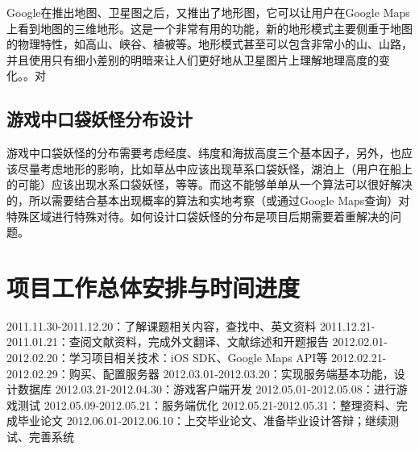 \documentclass{article}
\begin{document}
\begin{CJK}{UTF8}{gbsn}
  Google在推出地图、卫星图之后，又推出了地形图，它可以让用户在Google Maps上看到地图的三维地形。这是一个非常有用的功能，新的地形模式主要侧重于地图的物理特性，如高山、峡谷、植被等。地形模式甚至可以包含非常小的山、山路，并且使用只有细小差别的明暗来让人们更好地从卫星图片上理解地理高度的变化。\cite{B01}。对

  \subsection{游戏中口袋妖怪分布设计}

  游戏中口袋妖怪的分布需要考虑经度、纬度和海拔高度三个基本因子，另外，也应该尽量考虑地形的影响，比如草丛中应该出现草系口袋妖怪，湖泊上（用户在船上的可能）应该出现水系口袋妖怪，等等。而这不能够单单从一个算法可以很好解决的，所以需要结合基本出现概率的算法和实地考察（或通过Google Maps查询）对特殊区域进行特殊对待。如何设计口袋妖怪的分布是项目后期需要着重解决的问题。

  \section{项目工作总体安排与时间进度}
  2011.11.30-2011.12.20：了解课题相关内容，查找中、英文资料
  2011.12.21-2011.01.21：查阅文献资料，完成外文翻译、文献综述和开题报告
  2012.02.01-2012.02.20：学习项目相关技术：iOS SDK、Google Maps API等
  2012.02.21-2012.02.29：购买、配置服务器
  2012.03.01-2012.03.20：实现服务端基本功能，设计数据库
  2012.03.21-2012.04.30：游戏客户端开发
  2012.05.01-2012.05.08：进行游戏测试
  2012.05.09-2012.05.21：服务端优化
  2012.05.21-2012.05.31：整理资料、完成毕业论文
  2012.06.01-2012.06.10：上交毕业论文、准备毕业设计答辩；继续测试、完善系统

	

	\end{CJK}
\end{document}
